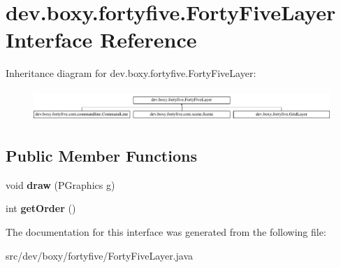 \hypertarget{interfacedev_1_1boxy_1_1fortyfive_1_1_forty_five_layer}{
\section{dev.boxy.fortyfive.FortyFiveLayer Interface Reference}
\label{d1/d87/interfacedev_1_1boxy_1_1fortyfive_1_1_forty_five_layer}
}
Inheritance diagram for dev.boxy.fortyfive.FortyFiveLayer:\begin{figure}[H]
\begin{center}
\leavevmode
\includegraphics[height=1.192758cm]{d1/d87/interfacedev_1_1boxy_1_1fortyfive_1_1_forty_five_layer}
\end{center}
\end{figure}
\subsection*{Public Member Functions}
\begin{DoxyCompactItemize}
\item 
\hypertarget{interfacedev_1_1boxy_1_1fortyfive_1_1_forty_five_layer_ac91b1405ef868958a4dd55b04e7d8b02}{
void {\bfseries draw} (PGraphics g)}
\label{d1/d87/interfacedev_1_1boxy_1_1fortyfive_1_1_forty_five_layer_ac91b1405ef868958a4dd55b04e7d8b02}

\item 
\hypertarget{interfacedev_1_1boxy_1_1fortyfive_1_1_forty_five_layer_a0745af18e2f1576b7370870580f3f0a6}{
int {\bfseries getOrder} ()}
\label{d1/d87/interfacedev_1_1boxy_1_1fortyfive_1_1_forty_five_layer_a0745af18e2f1576b7370870580f3f0a6}

\end{DoxyCompactItemize}


The documentation for this interface was generated from the following file:\begin{DoxyCompactItemize}
\item 
src/dev/boxy/fortyfive/FortyFiveLayer.java\end{DoxyCompactItemize}
